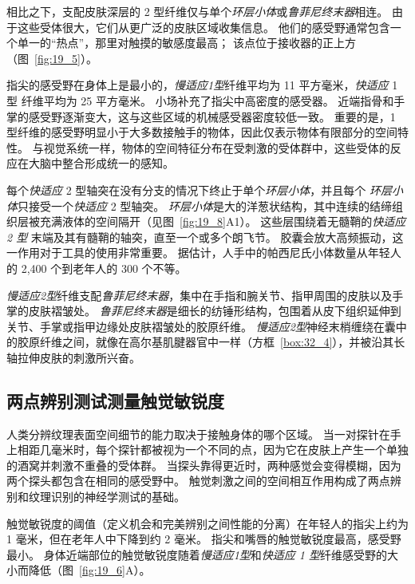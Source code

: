 相比之下，支配皮肤深层的 2 型纤维仅与单个\textit{环层小体}或\textit{鲁菲尼终末器}相连。
由于这些受体很大，它们从更广泛的皮肤区域收集信息。 
他们的感受野通常包含一个单一的“热点”，那里对触摸的敏感度最高；
该点位于接收器的正上方（图~\ref{fig:19_5}）。


指尖的感受野在身体上是最小的，\textit{慢适应1型}纤维平均为 11 平方毫米，\textit{快适应} 1型 纤维平均为 25 平方毫米。
小场补充了指尖中高密度的感受器。
近端指骨和手掌的感受野逐渐变大，这与这些区域的机械感受器密度较低一致。
重要的是，1 型纤维的感受野明显小于大多数接触手的物体，因此仅表示物体有限部分的空间特性。
与视觉系统一样，物体的空间特征分布在受刺激的受体群中，这些受体的反应在大脑中整合形成统一的感知。


每个\textit{快适应} 2 型轴突在没有分支的情况下终止于单个\textit{环层小体}，并且每个 \textit{环层小体}只接受一个\textit{快适应} 2 型轴突。
\textit{环层小体}是大的洋葱状结构，其中连续的结缔组织层被充满液体的空间隔开（见图~\ref{fig:19_8}A1）。
这些层围绕着无髓鞘的\textit{快适应 2 型} 末端及其有髓鞘的轴突，直至一个或多个朗飞节。
胶囊会放大高频振动，这一作用对于工具的使用非常重要。
据估计，人手中的帕西尼氏小体数量从年轻人的 2,400 个到老年人的 300 个不等。


\textit{慢适应2型}纤维支配\textit{鲁菲尼终末器}，集中在手指和腕关节、指甲周围的皮肤以及手掌的皮肤褶皱处。
\textit{鲁菲尼终末器}是细长的纺锤形结构，包围着从皮下组织延伸到关节、手掌或指甲边缘处皮肤褶皱处的胶原纤维。
\textit{慢适应2型}神经末梢缠绕在囊中的胶原纤维之间，就像在高尔基肌腱器官中一样（方框~\ref{box:32_4}），并被沿其长轴拉伸皮肤的刺激所兴奋。



\subsection{两点辨别测试测量触觉敏锐度}

人类分辨纹理表面空间细节的能力取决于接触身体的哪个区域。
当一对探针在手上相距几毫米时，每个探针都被视为一个不同的点，因为它在皮肤上产生一个单独的酒窝并刺激不重叠的受体群。
当探头靠得更近时，两种感觉会变得模糊，因为两个探头都包含在相同的感受野中。
触觉刺激之间的空间相互作用构成了两点辨别和纹理识别的神经学测试的基础。


触觉敏锐度的阈值（定义机会和完美辨别之间性能的分离）在年轻人的指尖上约为 1 毫米，但在老年人中下降到约 2 毫米。
指尖和嘴唇的触觉敏锐度最高，感受野最小。
身体近端部位的触觉敏锐度随着\textit{慢适应1型}和\textit{快适应 1 型}纤维感受野的大小而降低（图~\ref{fig:19_6}A）。


